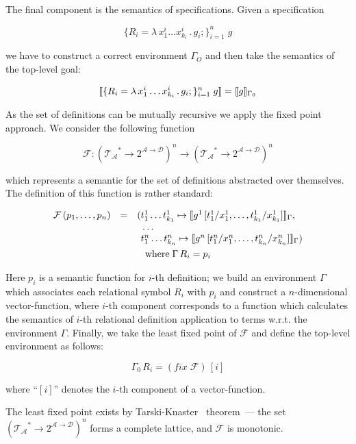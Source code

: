 The final component is the semantics of specifications. Given a specification

\[
\{R_i=\lambda\,x_1^i\dots x_{k_i}^i\,.\,g_i;\}_{i=1}^n\;g
\]

we have to construct a correct environment $\Gamma_O$ and then take the semantics of the top-level goal:

\[
\llbracket{\{R_i=\lambda\,x_1^i\dots x_{k_i}^i\,.\,g_i;\}_{i=1}^n\;g}\rrbracket=\llbracket{g}\rrbracket_{\Gamma_0}
\]

As the set of definitions can be mutually recursive we apply the fixed point approach. We consider the following
function

\[
\mathcal{F} : (\mathcal{T_A}^*\to 2^{\mathcal{A}\to\mathcal{D}})^n\to (\mathcal{T_A}^*\to 2^{\mathcal{A}\to\mathcal{D}})^n
\]

which represents a semantic for the set of definitions abstracted over themselves. The definition of this function is
rather standard:

\begin{gather*}
    \begin{array}{rcl}
      \mathcal{F}\,(p_1,\dots,p_n)& = &(t^1_1\dots t^1_{k_1}\mapsto\llbracket{g^1\,[t^1_1/x^1_1,\dots,t^1_{k_1}/x^1_{k_1}]}\rrbracket_\Gamma,\\
                                  &  &\phantom{(}\dots\\
                                  &  &\phantom{(}t^n_1\dots t^n_{k_n}\mapsto\llbracket{g^n\,[t^n_1/x^n_1,\dots,t^n_{k_n}/x^n_{k_n}]}\rrbracket_\Gamma)
    \end{array}\\
    \mbox{where}\;\Gamma\, R_i=p_i
\end{gather*}

Here $p_i$ is a semantic function for $i$-th definition; we build an environment $\Gamma$ which associates each relational symbol
$R_i$ with $p_i$ and construct a $n$-dimensional vector-function, where $i$-th component corresponds to a function which
calculates the semantics of $i$-th relational definition application to terms w.r.t. the environment $\Gamma$. Finally,
we take the least fixed point of $\mathcal{F}$ and define the top-level environment as follows:

\[
\Gamma_0\,R_i=(fix\;\mathcal{F})\,[i]
\]

where ``$[i]$'' denotes the $i$-th component of a vector-function.

The least fixed point exists by Tarski-Knaster~\cite{TarskiKnaster} theorem~--- the set $(\mathcal{T_A}^*\to 2^{\mathcal{A}\to\mathcal{D}})^n$
forms a complete lattice, and $\mathcal{F}$ is monotonic. 


